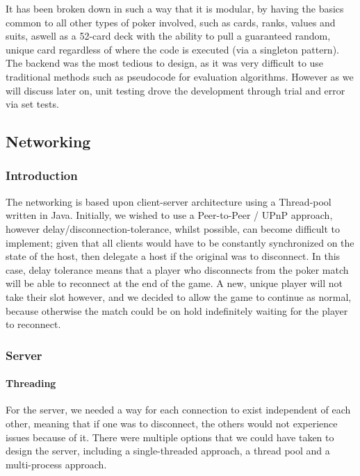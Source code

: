 \documentclass[11pt]{article}
\begin{document}
It has been broken down in such a way that it is modular, by having the basics common to all other types of poker involved, such as cards, ranks, values and suits, aswell as a 52-card deck with the ability to pull a guaranteed random, unique card regardless of where the code is executed (via a singleton pattern). \\
The backend was the most tedious to design, as it was very difficult to use traditional methods such as pseudocode for evaluation algorithms. However as we will discuss later on, unit testing drove the development through trial and error via set tests. 

\newpage

\subsection{Networking}
\subsubsection{Introduction}
The networking is based upon client-server architecture using a Thread-pool written in Java. Initially, we wished to use a Peer-to-Peer / UPnP approach, however delay/disconnection-tolerance, whilst possible, can become difficult to implement; given that all clients would have to be constantly synchronized on the state of the host, then delegate a host if the original was to disconnect. %
In this case, delay tolerance means that a player who disconnects from the poker match will be able to reconnect at the end of the game. A new, unique player will not take their slot however, and we decided to allow the game to continue as normal, because otherwise the match could be on hold indefinitely waiting for the player to reconnect.

\subsubsection{Server}

\paragraph*{Threading} 

For the server, we needed a way for each connection to exist independent of each other, meaning that if one was to disconnect, the others would not experience issues because of it. There were multiple options that we could have taken to design the server, including a single-threaded approach, a thread pool and a multi-process approach. 
\end{document}

